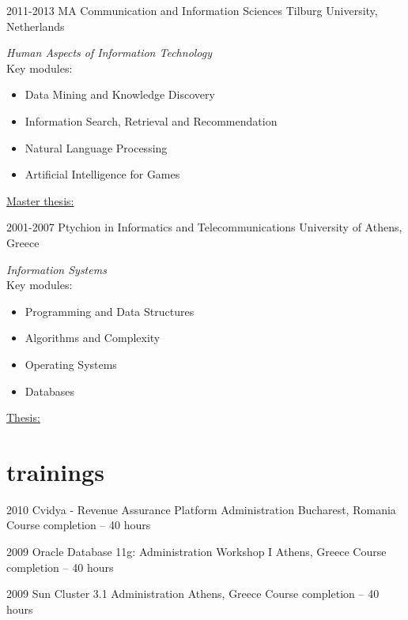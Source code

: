 \documentclass[]{friggeri-cv} %
\begin{document}
\begin{entrylist}


\entry
{2011-2013}
{MA Communication and Information Sciences}
{Tilburg University, Netherlands}
{\emph{Human Aspects of Information Technology} \\ 
Key modules:
\begin{itemize}
\item Data Mining and Knowledge Discovery
\item Information Search, Retrieval and Recommendation
\item Natural Language Processing
\item Artificial Intelligence for Games
\end{itemize}
\underline{Master thesis:}
}


\entry
{2001-2007}
{Ptychion in Informatics and Telecommunications}
{University of Athens, Greece}
{\emph{Information Systems} \\
Key modules:
\begin{itemize}
\item Programming and Data Structures
\item Algorithms and Complexity
\item Operating Systems
\item Databases
\end{itemize}
\underline{Thesis:}
}


\end{entrylist}


\section{trainings}

\begin{entrylist}


\entry
{2010}
{Cvidya - Revenue Assurance Platform Administration}
{Bucharest, Romania}
{Course completion -- 40 hours}

\entry
{2009}
{Oracle Database 11g: Administration Workshop I}
{Athens, Greece}
{Course completion -- 40 hours}

\entry
{2009}
{Sun Cluster 3.1 Administration}
{Athens, Greece}
{Course completion -- 40 hours}

\end{entrylist}
\end{document}
